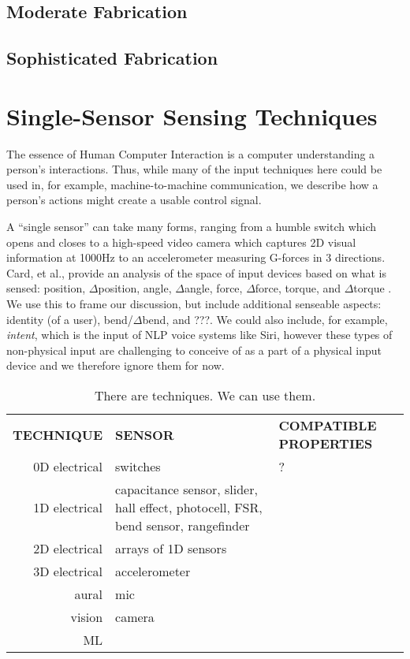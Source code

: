 \subsection{Moderate Fabrication}

\subsection{Sophisticated Fabrication}

\section{Single-Sensor Sensing Techniques}

The essence of Human Computer Interaction is a computer understanding a person's interactions. Thus, while many of the input techniques here could be used in, for example, machine-to-machine communication, we describe how a person's actions might create a usable control signal.

A ``single sensor'' can take many forms, ranging from a humble switch which opens and closes to a high-speed video camera which captures 2D visual information at 1000Hz to an accelerometer measuring G-forces in 3 directions. Card, et al., provide an analysis of the space of input devices based on what is sensed: position, $\Delta$position, angle, $\Delta$angle, force, $\Delta$force, torque, and $\Delta$torque \cite{card-input}. We use this to frame our discussion, but include additional senseable aspects: identity (of a user), bend/$\Delta$bend, and ???. We could also include, for example, \emph{intent}, which is the input of NLP voice systems like Siri, however these types of non-physical input are challenging to conceive of as a part of a physical input device and we therefore ignore them for now.

\begin{table}
\begin{center}
\begin{tabular}{rll}
\textbf{TECHNIQUE} & \textbf{SENSOR} & \textbf{COMPATIBLE PROPERTIES} \\
0D electrical & switches & ? \\
1D electrical & capacitance sensor, slider, hall effect, photocell, FSR, bend sensor, rangefinder & \\
2D electrical & arrays of 1D sensors & \\
3D electrical & accelerometer & \\
aural & mic & \\
vision & camera & \\
ML & & \\
\end{tabular}
\end{center}
\caption{There are techniques. We can use them. }
\label{table:sensing}
\end{table}



